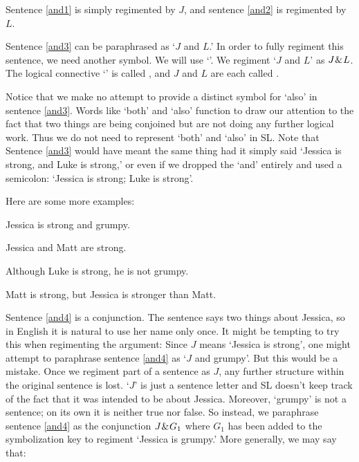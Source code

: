 Sentence \ref{and1} is simply regimented by $J$, and sentence \ref{and2} is regimented by $L$.

Sentence \ref{and3} can be paraphrased as `$J$ and $L$.'
In order to fully regiment this sentence, we need another symbol.
We will use `\eand'.
We regiment `$J$ and $L$' as $J\mkern1mu\&\mkern1mu L$.
The logical connective `\eand' is called , and $J$ and $L$ are each called .

Notice that we make no attempt to provide a distinct symbol for `also' in sentence \ref{and3}.
Words like `both' and `also' function to draw our attention to the fact that two things are being conjoined but are not doing any further logical work.
Thus we do not need to represent `both' and `also' in SL.
Note that Sentence \ref{and3} would have meant the same thing had it simply said `Jessica is strong, and Luke is strong,' or even if we dropped the `and' entirely and used a semicolon: `Jessica is strong; Luke is strong'.

Here are some more examples:

\begin{earg}
\item[\ex{and4}]Jessica is strong and grumpy.
\item[\ex{and5}]Jessica and Matt are strong.
\item[\ex{and6}]Although Luke is strong, he is not grumpy.
\item[\ex{and7}]Matt is strong, but Jessica is stronger than Matt.
\end{earg}

Sentence \ref{and4} is a conjunction.
The sentence says two things about Jessica, so in English it is natural to use her name only once.
It might be tempting to try this when regimenting the argument: Since $J$ means `Jessica is strong', one might attempt to paraphrase sentence \ref{and4} as `$J$ and grumpy'.
But this would be a mistake.
Once we regiment part of a sentence as $J$, any further structure within the original sentence is lost.
`$J$' is just a sentence letter and SL doesn't keep track of the fact that it was intended to be about Jessica.
Moreover, `grumpy' is not a sentence; on its own it is neither true nor false.
So instead, we paraphrase sentence \ref{and4} as the conjunction $J \mkern1mu\&\mkern1mu G_{1}$ where $G_{1}$ has been added to the symbolization key to regiment `Jessica is grumpy.'
More generally, we may say that:



